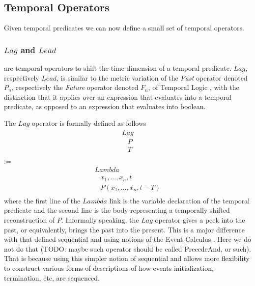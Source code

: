 \documentclass[runningheads]{llncs}
\newcommand{\SP}{\;\;\;}
\newcommand{\TLamb}{\textit{Lambda}}
\newcommand{\TLag}{\textit{Lag}}
\newcommand{\TLead}{\textit{Lead}}
\begin{document}
\subsection{Temporal Operators}
Given temporal predicates we can now define a small set of temporal
operators.

\subsubsection{$\TLag$ and $\TLead$} are temporal operators to shift the
time dimension of a temporal predicate.  $\TLag$, respectively
$\TLead$, is similar to the metric variation of the \emph{Past}
operator denoted $P_n$, respectively the \emph{Future} operator
denoted $F_n$, of Temporal Logic \cite{Prior 1967, Chapter VI}, with
the distinction that it applies over an expression that evaluates into
a temporal predicate, as opposed to an expression that evaluates into
boolean.

The $\TLag$ operator is formally defined as follows
$$
\begin{array}{l}
  \TLag\\
  \SP P\\
  \SP T\\
\end{array}
$$
:=
$$
\begin{array}{l}
  \TLamb\\
  \SP x_1, ..., x_n, t\\
  \SP P(x_1, ..., x_n, t-T)\\
\end{array}
$$
where the first line of the $\TLamb$ link is the variable
declaration of the temporal predicate and the second line is the body
representing a temporally shifted reconstruction of $P$.  Informally
speaking, the $\TLag$ operator gives a peek into the past, or
equivalently, brings the past into the present.  This is a major
difference with \cite{PLN} that defined sequential and using notions
of the Event Calculus \cite{TODO}.  Here we do not do that (TODO:
maybe such operator should be called PrecedeAnd, or such).  That is
because using this simpler notion of sequential and allows more
flexibility to construct various forms of descriptions of how events
initialization, termination, etc, are sequenced.
\end{document}
